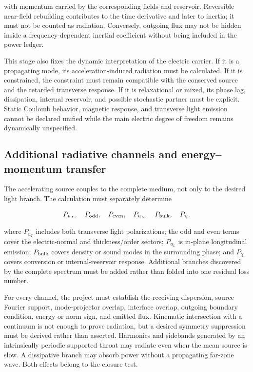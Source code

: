 with momentum carried by the corresponding fields and reservoir. Reversible
near-field rebuilding contributes to the time derivative and later to inertia;
it must not be counted as radiation. Conversely, outgoing flux may not be
hidden inside a frequency-dependent inertial coefficient without being included
in the power ledger.

This stage also fixes the dynamic interpretation of the electric carrier. If it
is a propagating mode, its acceleration-induced radiation must be calculated.
If it is constrained, the constraint must remain compatible with the conserved
source and the retarded transverse response. If it is relaxational or mixed,
its phase lag, dissipation, internal reservoir, and possible stochastic partner
must be explicit. Static Coulomb behavior, magnetic response, and transverse
light emission cannot be declared unified while the main electric degree of
freedom remains dynamically unspecified.

\subsection{Additional radiative channels and energy--momentum transfer}

The accelerating source couples to the complete medium, not only to the desired
light branch. The calculation must separately determine

\[
P_{u_T},
\quad
P_{\rm odd},
\quad
P_{\rm even},
\quad
P_{u_L},
\quad
P_{\rm bulk},
\quad
P_\chi,
\]

where \(P_{u_T}\) includes both transverse light polarizations; the odd and even
terms cover the electric-normal and thickness/order sectors; \(P_{u_L}\) is
in-plane longitudinal emission; \(P_{\rm bulk}\) covers density or sound modes
in the surrounding phase; and \(P_\chi\) covers conversion or internal-reservoir
response. Additional branches discovered by the complete spectrum must be added
rather than folded into one residual loss number.

For every channel, the project must establish the receiving dispersion, source
Fourier support, mode-projector overlap, interface overlap, outgoing boundary
condition, energy or norm sign, and emitted flux. Kinematic intersection with a
continuum is not enough to prove radiation, but a desired symmetry suppression
must be derived rather than asserted. Harmonics and sidebands generated by an
intrinsically periodic supported throat may radiate even when the mean source is
slow. A dissipative branch may absorb power without a propagating far-zone wave.
Both effects belong to the closure test.

